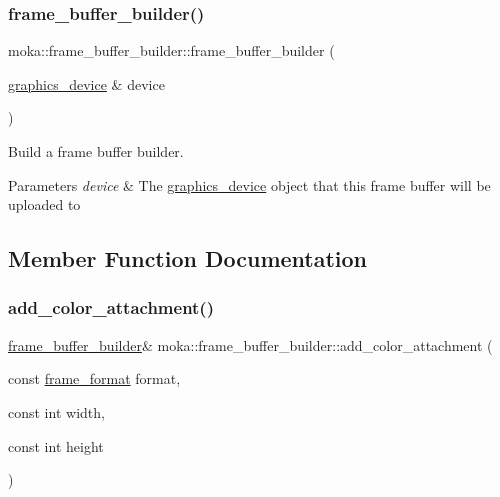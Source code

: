 \mbox{\label{structmoka_1_1frame__buffer__builder_ae89d036ae7b2e0b0961069ae320b9657}} 
\subsubsection{\texorpdfstring{frame\_buffer\_builder()}{frame\_buffer\_builder()}\hspace{0.1cm}{\footnotesize\ttfamily [2/2]}}
{\footnotesize\ttfamily moka\+::frame\+\_\+buffer\+\_\+builder\+::frame\+\_\+buffer\+\_\+builder (\begin{DoxyParamCaption}\item[{\mbox{\hyperlink{classmoka_1_1graphics__device}{graphics\+\_\+device}} \&}]{device }\end{DoxyParamCaption})\hspace{0.3cm}{\ttfamily [explicit]}}



Build a frame buffer builder. 


\begin{DoxyParams}{Parameters}
{\em device} & The \mbox{\hyperlink{classmoka_1_1graphics__device}{graphics\+\_\+device}} object that this frame buffer will be uploaded to \\
\hline
\end{DoxyParams}


\subsection{Member Function Documentation}
\mbox{\label{structmoka_1_1frame__buffer__builder_aecaa9eb51546554c3464fc0efd6d5311}} 
\subsubsection{\texorpdfstring{add\_color\_attachment()}{add\_color\_attachment()}\hspace{0.1cm}{\footnotesize\ttfamily [1/2]}}
{\footnotesize\ttfamily \mbox{\hyperlink{structmoka_1_1frame__buffer__builder}{frame\+\_\+buffer\+\_\+builder}}\& moka\+::frame\+\_\+buffer\+\_\+builder\+::add\+\_\+color\+\_\+attachment (\begin{DoxyParamCaption}\item[{const \mbox{\hyperlink{namespacemoka_a2ce6b5e22cd8e423713ef76033a279de}{frame\+\_\+format}}}]{format,  }\item[{const int}]{width,  }\item[{const int}]{height }\end{DoxyParamCaption})\hspace{0.3cm}{\ttfamily [inline]}}

